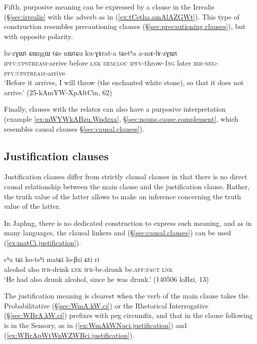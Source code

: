  Fifth, purposive meaning can be expressed by a clause in the Irrealis (§\ref{sec:irrealis} with the adverb  as in (\ref{ex:tCetha.amAlAZGWt}). This type of construction resembles precautioning clauses (§\ref{sec:precautioning.clauses}), but with opposite polarity.

 \begin{exe}
\ex \label{ex:tCetha.amAlAZGWt}
\gll lu-zɣɯt ɕɯŋgɯ tɕe nɯtɕu ku-ɣɤrat-a tɕetʰa a-mɤ-lɤ-zɣɯt \\
\textsc{ipfv}:\textsc{upstream}-arrive before \textsc{lnk} \textsc{dem}:\textsc{loc} \textsc{ipfv}-throw-\textsc{1sg} later \textsc{irr}-\textsc{neg}-\textsc{pfv}:\textsc{upstream}-arrive \\
\glt `Before it arrives, I will throw (the enchanted white stone), so that it does not arrive.' (25-kAmYW-XpAltCin, 62)
\end{exe}

Finally, clauses with the relator  can also have a purposive interpretation (example \ref{ex:mWYWkABzu.Wndzxa}, §\ref{sec:nouns.cause.complement}, which resembles causal clauses §\ref{sec:causal.clauses}).

\subsection{Justification clauses} \label{sec:justification.clauses} 
Justification clauses \citep{lopes09justification} differ from strictly clausal clauses in that there is no direct causal  relationship between the main clause and the justification clause. Rather, the truth value of the latter allows to make an inference concerning the truth value of the latter. 

In Japhug, there is no dedicated construction to express such meaning, and as in many languages, the clausal linkers  and  (§\ref{sec:causal.clauses}) can be used (\ref{ex:matCi.justification}). 

\begin{exe}
\ex \label{ex:matCi.justification}
\gll cʰa tɕi ko-tsʰi matɕi lo-βzi ɕti ri \\
alcohol also \textsc{ifr}-drink \textsc{lnk} \textsc{ifr}-be.drunk be.\textsc{aff}:\textsc{fact} \textsc{lnk} \\
\glt `He had also drunk alcohol, since he was drunk.' (140506 loBzi, 13)
 \end{exe}

The justification meaning is clearest when the verb of the main clause takes the Probabilitative  (§\ref{sec:WmA.kW.ci}) or the Rhetorical Interrogative  (§\ref{sec:WBrA.kW.ci}) prefixes with peg circumfix, and that in the clause following  is in the Sensory, as in (\ref{ex:WmAkWNuci.justification}) and (\ref{ex:WBrApWtWnWZWBci.justification}).
 
